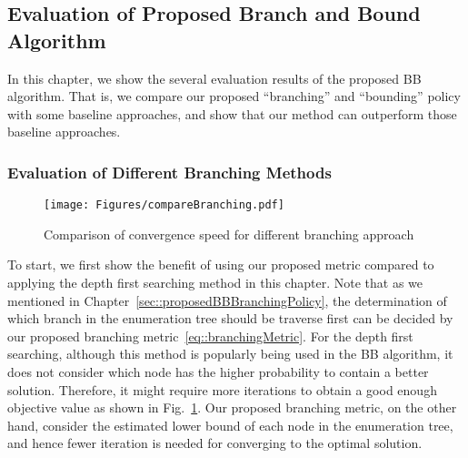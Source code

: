 \subsection{Evaluation of Proposed Branch and Bound Algorithm}
In this chapter, we show the several evaluation results of the proposed BB algorithm.
That is, we compare our proposed ``branching'' and ``bounding'' policy with some baseline approaches, and show that our method can outperform those baseline approaches.

\subsubsection{Evaluation of Different Branching Methods}
\begin{figure}
\begin{center}
\texttt{[image: Figures/compareBranching.pdf]}
\caption{\label{fig::compareBranching} Comparison of convergence speed for different branching approach}
\end{center}
\end{figure}
To start, we first show the benefit of using our proposed metric compared to applying the depth first searching method in this chapter.
Note that as we mentioned in Chapter~\ref{sec::proposedBBBranchingPolicy}, the determination of which branch in the enumeration tree should be traverse first can be decided by our proposed branching metric~\eqref{eq::branchingMetric}.
For the depth first searching, although this method is popularly being used in the BB algorithm, it does not consider which node has the higher probability to contain a better solution.
Therefore, it might require more iterations to obtain a good enough objective value as shown in Fig.~\ref{fig::compareBranching}.
Our proposed branching metric, on the other hand, consider the estimated lower bound of each node in the enumeration tree, and hence fewer iteration is needed for converging to the optimal solution.

